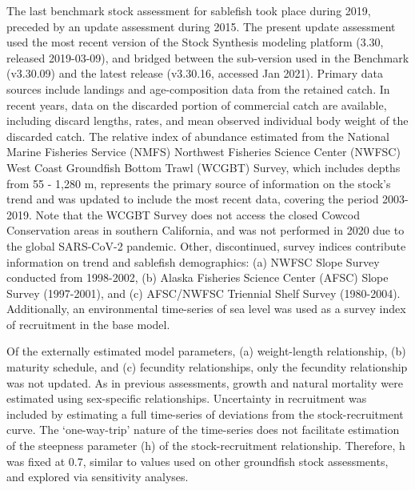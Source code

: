 \documentclass[11pt,
  english,
  a4paper,
]{article}
\begin{document}
\leavevmode\tagmcend\tagstructend


The last benchmark stock assessment for sablefish took place during 2019, preceded by an update assessment during 2015. The present update assessment used the most recent version of the Stock Synthesis modeling platform (3.30, released 2019-03-09), and bridged between the sub-version used in the Benchmark (v3.30.09) and the latest release (v3.30.16, accessed Jan 2021). Primary data sources include landings and age-composition data from the retained catch. In recent years, data on the discarded portion of commercial catch are available, including discard lengths, rates, and mean observed individual body weight of the discarded catch. The relative index of abundance estimated from the National Marine Fisheries Service (NMFS) Northwest Fisheries Science Center (NWFSC) West Coast Groundfish Bottom Trawl (WCGBT) Survey, which includes depths from 55 - 1,280 m, represents the primary source of information on the stock's trend and was updated to include the most recent data, covering the period 2003-2019. Note that the WCGBT Survey does not access the closed Cowcod Conservation areas in southern California, and was not performed in 2020 due to the global SARS-CoV-2 pandemic. Other, discontinued, survey indices contribute information on trend and sablefish demographics: (a) NWFSC Slope Survey conducted from 1998-2002, (b) Alaska Fisheries Science Center (AFSC) Slope Survey (1997-2001), and (c) AFSC/NWFSC Triennial Shelf Survey (1980-2004). Additionally, an environmental time-series of sea level was used as a survey index of recruitment in the base model.

\leavevmode\tagmcend\tagstructend\par


Of the externally estimated model parameters, (a) weight-length relationship, (b) maturity schedule, and (c) fecundity relationships, only the fecundity relationship was not updated. As in previous assessments, growth and natural mortality were estimated using sex-specific relationships. Uncertainty in recruitment was included by estimating a full time-series of deviations from the stock-recruitment curve. The `one-way-trip' nature of the time-series does not facilitate estimation of the steepness parameter (h) of the stock-recruitment relationship. Therefore, h was fixed at 0.7, similar to values used on other groundfish stock assessments, and explored via sensitivity analyses.
\end{document}
